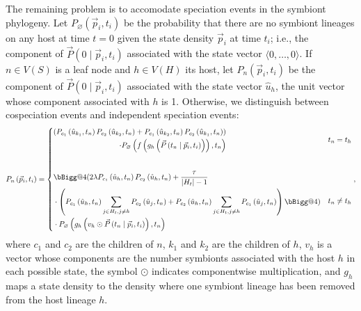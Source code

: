 \documentclass{article}
\makeatletter
\newcommand{\vast}{\bBigg@{4}}
\makeatother
\begin{document}
            The remaining problem is to accomodate speciation events in the
            symbiont phylogeny. Let $P_\varnothing\left(\vec{p}_i, t_i\right)$
            be the probability that there are no symbiont lineages on any host
            at time $t = 0$ given the state density $\vec{p}_i$ at time $t_i$;
            i.e., the component of $\vec{P}\left(0\mid\vec{p}_i, t_i\right)$
            associated with the state vector $\langle0,\dots,0\rangle$.  If $n
            \in V\left(S\right)$ is a leaf node and $h \in V\left(H\right)$ its
            host, let $P_n\left(\vec{p}_i, t_i\right)$ be the component of
            $\vec{P}\left(0\mid\vec{p}_i, t_i\right)$ associated with the state
            vector $\hat{u}_h$, the unit vector whose component associated with
            $h$ is 1. Otherwise, we distinguish between cospeciation events and
            independent speciation events:
            \begin{equation}
                P_n\left(\vec{p}_i, t_i\right) =
                \begin{cases}
                    \begin{aligned}
                        \left(P_{c_1}\left(\hat{u}_{k_1}, t_n\right)
                        P_{c_2}\left(\hat{u}_{k_2}, t_n\right) +
                        P_{c_1}\left(\hat{u}_{k_2}, t_n\right)
                        P_{c_2}\left(\hat{u}_{k_1}, t_n\right)\right) \\
                        \cdot P_\varnothing\left(f\left(g_h\left(\vec{P}\left(t_n\mid
                        \vec{p}_i, t_i\right)\right)\right), t_n\right)
                    \end{aligned} & t_n = t_h \\[8ex]
                    \begin{aligned}
                        & \vast( 2\lambda P_{c_1}\left(\hat{u}_h,
                        t_n\right) P_{c_2}\left(\hat{u}_h, t_n\right) +
                        \frac{\tau}{\lvert{H_t}\rvert-1} \\
                        &\cdot\left(P_{c_1}\left(\hat{u}_h, t_n\right)
                        \sum_{j\in H_t,j\neq h}{P_{c_2}\left(\hat{u}_j,
                        t_n\right)} + P_{c_2}\left(\hat{u}_h, t_n\right)
                        \sum_{j\in H_t,j\neq h}
                        {P_{c_1}\left(\hat{u}_j,t_n\right)}\right)\vast) \\
                        & \cdot P_\varnothing\left(
                        g_h\left(v_h\odot\vec{P}\left(t_n\mid\vec{p}_i,
                        t_i\right)\right), t_n\right)
                    \end{aligned}
                    & t_n \neq t_h
                \end{cases},
            \end{equation}
            where $c_1$ and $c_2$ are the children of $n$, $k_1$ and $k_2$
            are the children of $h$, $v_h$ is a vector whose components
            are the number symbionts associated with the host $h$ in each
            possible state, the symbol $\odot$ indicates componentwise
            multiplication, and $g_h$ maps a state density to the density where
            one symbiont lineage has been removed from the host lineage $h$.
\end{document}
